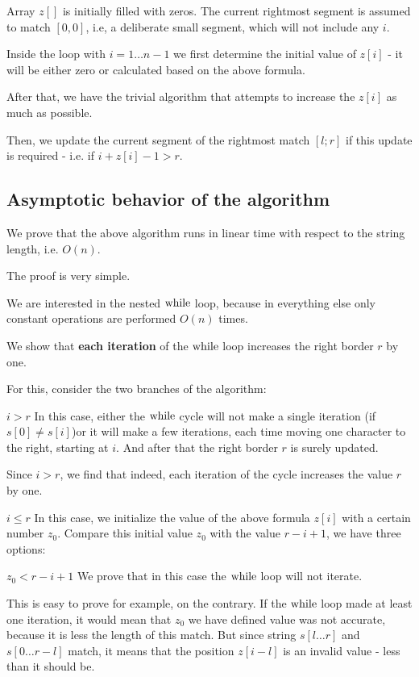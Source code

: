 Array $z []$ is initially filled with zeros. The current rightmost segment is assumed to match $[0, 0]$, i.e, a deliberate small segment, which will not include any $i$.

Inside the loop with $i = 1 \ldots n-1$ we first determine the initial value of $z [i]$ - it will be either zero or calculated based on the above formula.

After that, we have the trivial algorithm that attempts to increase the $z [i]$ as much as possible.

Then, we update the current segment of the rightmost match $[l; r]$ if this update is required - i.e. if $i + z [i] -1> r$.

\subsection{ Asymptotic behavior of the algorithm }

We prove that the above algorithm runs in linear time with respect to the string length, i.e. $O (n)$.

The proof is very simple.

We are interested in the nested $\rm while$ loop, because in everything else only constant operations are performed $O (n)$ times.

We show that \textbf{each iteration} of the $\rm while$ loop increases the right border $r$ by one.

For this, consider the two branches of the algorithm:

$i> r$
In this case, either the $\rm while$ cycle will not make a single iteration (if $s [0] \ne s [i]$)or it will make a few iterations, each time moving one character to the right, starting at $i$. And after that the right border $r$ is surely updated.

Since $i> r$, we find that indeed, each iteration of the cycle increases the value $r$ by one.

$i \le r$
In this case, we initialize the value of the above formula $z [i]$ with a certain number $z_0$. Compare this initial value $z_0$ with the value $r-i +1$, we have three options:

$z_0 <r-i +1$
We prove that in this case the $\rm while$ loop will not iterate.

This is easy to prove for example, on the contrary. If the $\rm while$ loop made at least one iteration, it would mean that $z_0$ we have defined value was not accurate, because it is less the length of this match. But since string $s [l \ldots r]$ and $s [0 \ldots r-l]$ match, it means that the position $z[i-l]$ is an invalid value - less than it should be.

